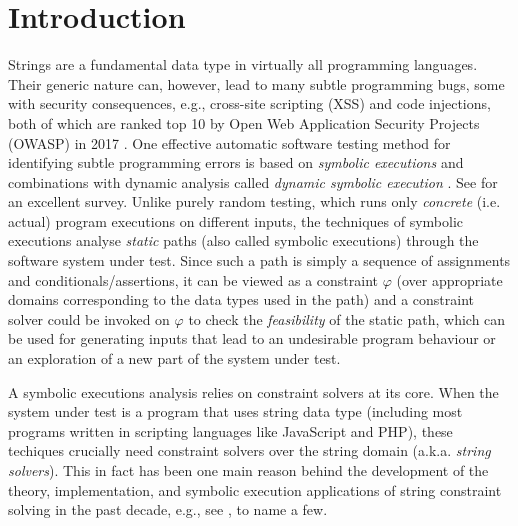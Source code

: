 \section{Introduction}
\label{sec:intro}

Strings are a fundamental data type in virtually all programming languages.
Their generic nature can, however, lead to many subtle programming 
bugs, some with security consequences, e.g., cross-site scripting
(XSS) and code injections, both of which are ranked top 10 by Open Web
Application Security Projects (OWASP) in 2017 \cite{owasp17}. One effective
automatic software testing method for identifying subtle programming errors
is based on \emph{symbolic executions} 
\cite{king76} and combinations with dynamic analysis
called \emph{dynamic symbolic execution} \cite{jalangi,DART,EXE,CUTE,KLEE}.
See \cite{symbex-survey} for an excellent survey. Unlike purely random testing,
which runs only \emph{concrete} (i.e. actual) program executions on different 
inputs, the techniques of symbolic executions analyse \emph{static} paths
(also called symbolic executions) through the software system under test.
Since such a path is simply a sequence of assignments and
conditionals/assertions, it can be viewed as a constraint $\varphi$ (over 
appropriate domains corresponding to the data types used in the path) and a 
constraint solver could be invoked on $\varphi$ to check the \emph{feasibility}
of the static path, which can be used for generating inputs that lead to 
an undesirable program behaviour or an exploration of a new part of the
system under test.

A symbolic executions analysis relies on constraint solvers at its core. When 
the system
under test is a program that uses string data type (including most programs 
written in scripting languages like JavaScript and PHP), these techiques 
crucially need constraint solvers over the string domain (a.k.a. \emph{string 
solvers}). This in fact has been one main reason behind the development of
the theory, implementation, and symbolic execution applications of string constraint 
solving in the past decade, e.g., see 
\cite{BTV09,Berkeley-JavaScript,HAMPI,Stranger,Vijay-length,YABI14,Abdulla14,LB16,fang-yu-circuits,Abdulla17,CCHLW18,HJLRV18,S3,TCJ16,Z3-str,Z3-str2,cvc4,BCFJKKV08,RVG12,jalangi,expose},
to name a few. %

